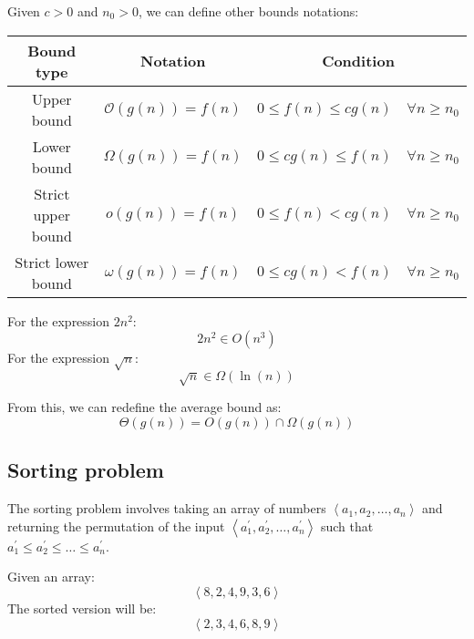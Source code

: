 Given $c > 0$ and $n_0 > 0$, we can define other bounds notations:
\renewcommand*{\arraystretch}{2}
\begin{table}[H]
    \centering
    \begin{tabular}{|c|c|c|}
    \hline
    \textbf{Bound type} & \textbf{Notation}         & \textbf{Condition}                                \\ \hline
    Upper bound         & $\mathcal{O} (g(n))=f(n)$ & $0 \leq f(n) \leq c g(n)\quad \forall n \geq n_0$ \\
    Lower bound         & $\Omega(g(n))=f(n)$       & $0 \leq c g(n) \leq f(n)\quad \forall n \geq n_0$ \\
    Strict upper bound  & $o(g(n))=f(n)$            & $0 \leq f(n) < c g(n)\quad \forall n \geq n_0$    \\
    Strict lower bound  & $\omega(g(n))=f(n)$       & $0 \leq c g(n) < f(n)\quad \forall n \geq n_0$    \\ \hline
    \end{tabular}
\end{table}
\renewcommand*{\arraystretch}{1}
\begin{example}
    For the expression $2n^2$: 
    \[2n^2 \in O(n^3)\]
    For the expression $\sqrt{n}$: 
    \[\sqrt{n} \in \Omega(\ln(n))\]
\end{example}
From this, we can redefine the average bound as:
\[\Theta(g(n))=O(g(n))\cap\Omega(g(n))\]

\subsection{Sorting problem}
The sorting problem involves taking an array of numbers $\left\langle a_1,a_2,\dots,a_n \right\rangle$ and returning the permutation of the input $\left\langle a_1^\prime,a_2^\prime,\dots,a_n^\prime \right\rangle$ such that $a_1^\prime\leq a_2^\prime \leq \dots \leq a_n^\prime$. 
\begin{example}
    Given an array: 
    \[\left\langle 8, 2, 4, 9, 3, 6 \right\rangle\]
    The sorted version will be: 
    \[\left\langle 2, 3, 4, 6, 8, 9 \right\rangle\]
\end{example}

